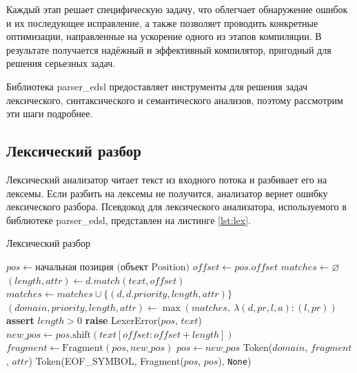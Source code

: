 \documentclass[14pt, russian]{scrartcl}
\begin{document}
Каждый этап решает специфическую задачу, что облегчает обнаружение ошибок и их последующее исправление, а
также позволяет проводить конкретные оптимизации, направленные на ускорение одного из этапов компиляции.
В результате получается надёжный и эффективный компилятор, пригодный для решения серьезных задач.

Библиотека parser\_edsl предоставляет инструменты для решения задач лексического, синтаксического и семантического
анализов, поэтому рассмотрим эти шаги подробнее.

\subsection{Лексический разбор}

Лексический анализатор читает текст из входного потока и разбивает его на лексемы. Если разбить на лексемы не получится,
анализатор вернет ошибку лексического разбора. Псевдокод для лексического анализатора, используемого в библиотеке
parser\_edsl, представлен на листинге \ref{lst:lex}.

\begin{listing}[H]
	\caption{Лексический разбор}
	\label{lst:lex}
\begin{algorithm}[H]
\begin{algorithmic}[1]
  \State $pos \gets \text{начальная позиция (объект Position)}$
    \State $offset \gets pos.offset$
    \State $matches \gets \varnothing$
      \State $(length, attr) \gets d.match(text, offset)$
      \State $matches \gets matches \cup \{(d, d.priority, length, attr)\}$
    \EndFor
    \State $(domain, priority, length, attr) \gets \max(matches,\ \lambda (d, pr, l, a): (l, pr))$
    \State \textbf{assert} $length > 0$
      \State \textbf{raise} LexerError($pos$, $text$)
    \EndIf
    \State $new\_pos \gets pos.\text{shift}(text[offset : offset + length])$
    \State $fragment \gets \text{Fragment}(pos, new\_pos)$
    \State $pos \gets new\_pos$
      \State \Return Token($domain$, $fragment$, $attr$)
    \EndIf
  \EndWhile
  \State \Return Token(EOF\_SYMBOL, Fragment($pos$, $pos$), \texttt{None})
\EndProcedure
\end{algorithmic}
\end{algorithm}
\end{listing}
\end{document}
